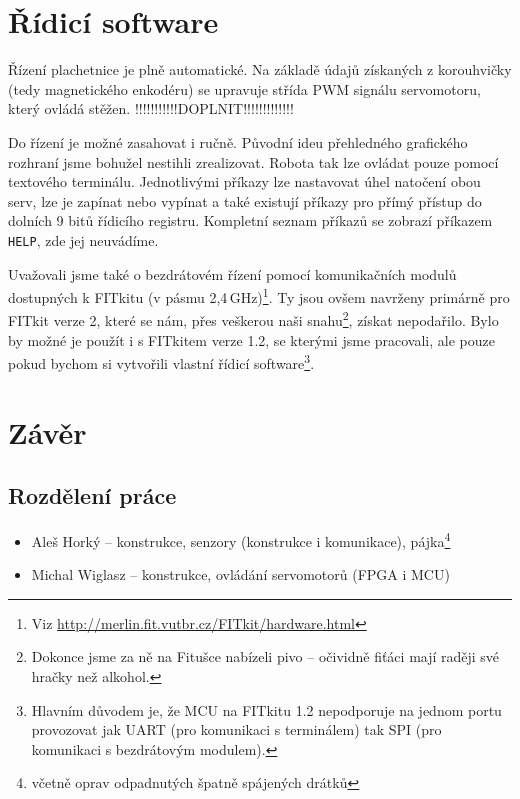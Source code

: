 \section{Řídicí software}

Řízení plachetnice je plně automatické. Na základě údajů získaných z korouhvičky (tedy magnetického enkodéru) se upravuje střída PWM signálu servomotoru, který ovládá stěžen. !!!!!!!!!!!DOPLNIT!!!!!!!!!!!!!

Do řízení je možné zasahovat i ručně. Původní ideu přehledného grafického rozhraní jsme bohužel nestihli zrealizovat. Robota tak lze ovládat pouze pomocí textového terminálu. Jednotlivými příkazy lze nastavovat úhel natočení obou serv, lze je zapínat nebo vypínat a také existují příkazy pro přímý přístup do dolních 9 bitů řídicího registru. Kompletní seznam příkazů se zobrazí příkazem \texttt{HELP}, zde jej neuvádíme.

Uvažovali jsme také o bezdrátovém řízení pomocí komunikačních modulů dostupných k FITkitu (v pásmu 2,4\,GHz)\footnote{Viz \url{http://merlin.fit.vutbr.cz/FITkit/hardware.html}}. Ty jsou ovšem navrženy primárně pro FITkit verze 2, které se nám, přes veškerou naši snahu\footnote{Dokonce jsme za ně na Fitušce nabízeli pivo -- očividně fiťáci mají raději své hračky než alkohol.}, získat nepodařilo. Bylo by možné je použít i s FITkitem verze 1.2, se kterými jsme pracovali, ale pouze pokud bychom si vytvořili vlastní řídicí software\footnote{Hlavním důvodem je, že MCU na FITkitu 1.2 nepodporuje na jednom portu provozovat jak UART (pro komunikaci s terminálem) tak SPI (pro komunikaci s bezdrátovým modulem).}.

\section{Závěr}

\subsection{Rozdělení práce}

\begin{itemize}
  \item Aleš Horký -- konstrukce, senzory (konstrukce i komunikace), pájka\footnote{včetně oprav odpadnutých špatně spájených drátků}
  \item Michal Wiglasz -- konstrukce, ovládání servomotorů (FPGA i MCU)
\end{itemize}


